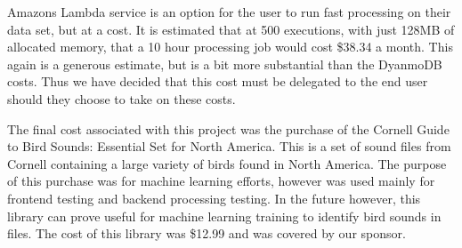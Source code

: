 Amazon\textquotesingle s Lambda service is an option for the user to run fast processing on their data set, but at a cost. It is estimated that at 500 executions, with just 128MB of allocated memory, that a 10 hour processing job would cost \$38.34 a month. This again is a generous estimate, but is a bit more substantial than the DyanmoDB costs. Thus we have decided that this cost must be delegated to the end user should they choose to take on these costs.\par
The final cost associated with this project was the purchase of the Cornell Guide to Bird Sounds: Essential Set for North America. This is a set of sound files from Cornell containing a large variety of birds found in North America. The purpose of this purchase was for machine learning efforts, however was used mainly for frontend testing and backend processing testing. In the future however, this library can prove useful for machine learning training to identify bird sounds in files. The cost of this library was \$12.99 and was covered by our sponsor.
